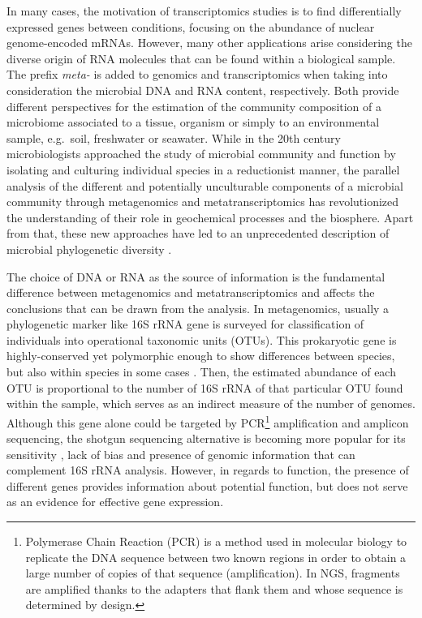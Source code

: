 \documentclass[
  openany]{book}
\begin{document}
In many cases, the motivation of transcriptomics studies is to find differentially expressed genes between conditions, focusing on the abundance of nuclear genome-encoded mRNAs. However, many other applications arise considering the diverse origin of RNA molecules that can be found within a biological sample. The prefix \emph{meta-} is added to genomics and transcriptomics when taking into consideration the microbial DNA and RNA content, respectively. Both provide different perspectives for the estimation of the community composition of a microbiome associated to a tissue, organism or simply to an environmental sample, e.g.~soil, freshwater or seawater. While in the 20th century microbiologists approached the study of microbial community and function by isolating and culturing individual species in a reductionist manner, the parallel analysis of the different and potentially unculturable components of a microbial community through metagenomics and metatranscriptomics has revolutionized the understanding of their role in geochemical processes and the biosphere. Apart from that, these new approaches have led to an unprecedented description of microbial phylogenetic diversity \autocite{Mardanov2018}.

The choice of DNA or RNA as the source of information is the fundamental difference between metagenomics and metatranscriptomics and affects the conclusions that can be drawn from the analysis. In metagenomics, usually a phylogenetic marker like 16S rRNA gene is surveyed for classification of individuals into operational taxonomic units (OTUs). This prokaryotic gene is highly-conserved yet polymorphic enough to show differences between species, but also within species in some cases \autocite{Pei2010}. Then, the estimated abundance of each OTU is proportional to the number of 16S rRNA of that particular OTU found within the sample, which serves as an indirect measure of the number of genomes. Although this gene alone could be targeted by PCR\footnote{Polymerase Chain Reaction (PCR) is a method used in molecular biology to replicate the DNA sequence between two known regions in order to obtain a large number of copies of that sequence (amplification). In NGS, fragments are amplified thanks to the adapters that flank them and whose sequence is determined by design.} amplification and amplicon sequencing, the shotgun sequencing alternative is becoming more popular for its sensitivity \autocite{Durazzi2021}, lack of bias \autocite{Brooks2015} and presence of genomic information that can complement 16S rRNA analysis. However, in regards to function, the presence of different genes provides information about potential function, but does not serve as an evidence for effective gene expression.
\end{document}
